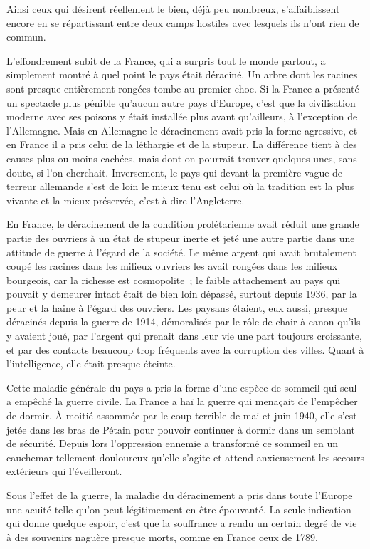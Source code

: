 \documentclass[french,twoside]{book} %
\begin{document}
Ainsi ceux qui désirent réellement le bien, déjà peu nombreux, s'affaiblissent encore en se répartissant entre deux camps hostiles avec lesquels ils n'ont rien de commun.\par
L'effondrement subit de la France, qui a surpris tout le monde partout, a simplement montré à quel point le pays était déraciné. Un arbre dont les racines sont presque entièrement rongées tombe au premier choc. Si la France a présenté un spectacle plus pénible qu'aucun autre pays d'Europe, c'est que la civilisation moderne avec ses poisons y était installée plus avant qu'ailleurs, à l'exception de l'Allemagne. Mais en Allemagne le déracinement avait pris la forme agressive, et en France il a pris celui de la léthargie et de la stupeur. La différence tient à des causes plus ou moins cachées, mais dont on pourrait trouver quelques-unes, sans doute, si l'on cherchait. Inversement, le pays qui devant la première vague de terreur allemande s'est de loin le mieux tenu est celui où la tradition est la plus vivante et la mieux préservée, c'est-à-dire l'Angleterre.\par
En France, le déracinement de la condition prolétarienne avait réduit une grande partie des ouvriers à un état de stupeur inerte et jeté une autre partie dans une attitude de guerre à l'égard de la société. Le même argent qui avait brutalement coupé les racines dans les milieux ouvriers les avait rongées dans les milieux bourgeois, car la richesse est cosmopolite ; le faible attachement au pays qui pouvait y demeurer intact était de bien loin dépassé, surtout depuis 1936, par la peur et la haine à l'égard des ouvriers. Les paysans étaient, eux aussi, presque déracinés depuis la guerre de 1914, démoralisés par le rôle de chair à canon qu'ils y avaient joué, par l'argent qui prenait dans leur vie une part toujours croissante, et par des contacts beaucoup trop fréquents avec la corruption des villes. Quant à l'intelligence, elle était presque éteinte.\par
Cette maladie générale du pays a pris la forme d'une espèce de sommeil qui seul a empêché la guerre civile. La France a haï la guerre qui menaçait de l'empêcher de dormir. À moitié assommée par le coup terrible de mai et juin 1940, elle s'est jetée dans les bras de Pétain pour pouvoir continuer à dormir dans un semblant de sécurité. Depuis lors l'oppression ennemie a transformé ce sommeil en un cauchemar tellement douloureux qu'elle s'agite et attend anxieusement les secours extérieurs qui l'éveilleront.\par
Sous l'effet de la guerre, la maladie du déracinement a pris dans toute l'Europe une acuité telle qu'on peut légitimement en être épouvanté. La seule indication qui donne quelque espoir, c'est que la souffrance a rendu un certain degré de vie à des souvenirs naguère presque morts, comme en France ceux de 1789.\par
\end{document}

